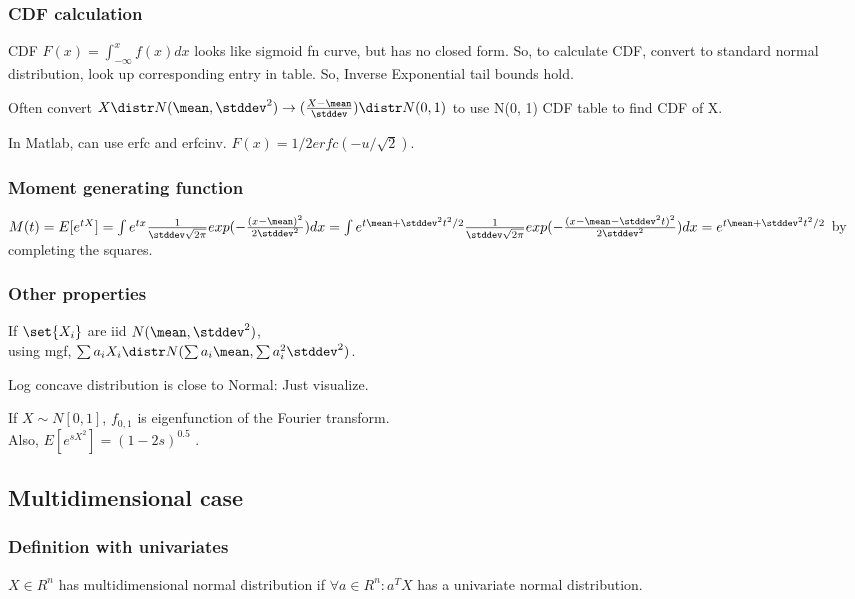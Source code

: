\documentclass[oneside, article]{memoir}
\begin{document}
\subsubsection{CDF calculation}
CDF $F(x) = \int_{-\infty}^{x} f(x)dx$ looks like sigmoid fn curve, but has no closed form. So, to calculate CDF, convert to standard normal distribution, look up corresponding entry in table. So, Inverse Exponential tail bounds hold. \chk

Often convert $X \distr N(\mean, \stddev^{2}) \to (\frac{X - \mean }{\stddev}) \distr N(0, 1)$ to use N(0, 1) CDF table to find CDF of X.

In Matlab, can use erfc and erfcinv. $F(x) = 1/2 erfc(-u/\sqrt{2})$.

\subsubsection{Moment generating function}
$M(t) = E[e^{tX}] = \int e^{tx}\frac{1}{\stddev \sqrt{2\pi}}exp(-\frac{(x-\mean)^{2}}{2\stddev^{2}}) dx \\
= \int e^{t\mean + \stddev^{2}t^{2}/2}\frac{1}{\stddev \sqrt{2\pi}}exp(-\frac{(x-\mean - \stddev^{2}t)^{2}}{2\stddev^{2}}) dx \\
= e^{t\mean + \stddev^{2}t^{2}/2}$ by completing the squares.

\subsubsection{Other properties}
If $\set{X_{i}}$ are iid $N(\mean, \stddev^{2})$, \\
using mgf, $\sum a_{i}X_{i} \distr N(\sum a_{i}\mean, \sum a_{i}^{2}\stddev^{2})$.

Log concave distribution is close to Normal: Just visualize.

If $X \sim N[0, 1]$, $f_{0,1}$ is eigenfunction of the Fourier transform. \\
Also, $E[e^{sX^{2}}] = (1-2s)^{0.5}$ \why.


\subsection{Multidimensional case}
\subsubsection{Definition with univariates}
$X \in R^{n}$ has multidimensional normal distribution if $\forall a \in R^{n}: a^{T}X$ has a univariate normal distribution.
\end{document}
